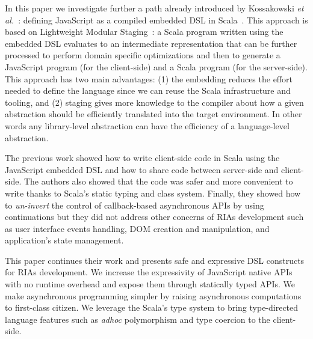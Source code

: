 \documentclass[american,english,runningheads]{llncs}
\newcommand{\etal}{\emph{et al.~}}
\begin{document}
In this paper we investigate further a path already introduced by Kossakowski \etal{}: defining JavaScript as a
compiled embedded DSL in Scala~\cite{Kossakowski12_JsDESL}. This approach is based on Lightweight Modular
Staging~\cite{Rompf12_LMSThesis}: a Scala program written using the embedded DSL evaluates to an intermediate
representation that can be further processed to perform domain specific optimizations and then to generate a
JavaScript program (for the client-side) and a Scala program (for the server-side). This approach has two main
advantages: (1) the embedding reduces the effort needed to define the language since we can reuse the Scala
infrastructure and tooling, and (2) staging gives more knowledge to the compiler about how a given abstraction
should be efficiently translated into the target environment. In other words any library-level abstraction can have
the efficiency of a language-level abstraction.

The previous work showed how to write client-side code in Scala using the JavaScript embedded DSL and how to share
code between server-side and client-side. The authors also showed that the code was safer and more convenient to
write thanks to Scala's static typing and class system. Finally, they showed how to \emph{un-invert} the control of
callback-based asynchronous APIs by using continuations but they did not address other concerns of RIAs development
such as user interface events handling, DOM creation and manipulation, and application’s state management.

This paper continues their work and presents safe and expressive DSL constructs for RIAs development. We increase the
expressivity of JavaScript native APIs with no runtime overhead and expose them through statically typed APIs. We
make asynchronous programming simpler by raising asynchronous computations to first-class citizen. We leverage the
Scala’s type system to bring type-directed language features such as \emph{adhoc} polymorphism and type coercion to
the client-side.
\end{document}

